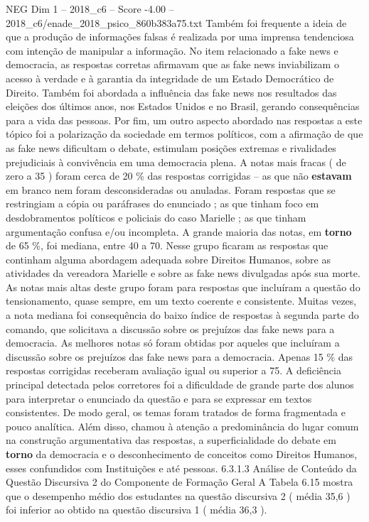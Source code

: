 \begin{textsample}{NEG Dim 1 – 2018\_c6 – Score -4.00 – 2018\_c6/enade\_2018\_psico\_860b383a75.txt}
Também foi frequente a ideia de que a produção de informações falsas é realizada por uma imprensa tendenciosa com intenção de manipular a informação.
No item relacionado a fake news e democracia, as respostas corretas afirmavam que as fake news inviabilizam o acesso à verdade e à garantia da integridade de um Estado Democrático de Direito.
Também foi abordada a influência das fake news nos resultados das eleições dos últimos anos, nos Estados Unidos e no Brasil, gerando consequências para a vida das pessoas.
Por fim, um outro aspecto abordado nas respostas a este tópico foi a polarização da sociedade em termos políticos, com a afirmação de que as fake news dificultam o debate, estimulam posições extremas e rivalidades prejudiciais à convivência em uma democracia plena.
A notas mais fracas ( de zero a 35 ) foram cerca de 20 \% das respostas corrigidas – as que não \textbf{estavam} em branco nem foram desconsideradas ou anuladas.
Foram respostas que se restringiam a cópia ou paráfrases do enunciado ; as que tinham foco em desdobramentos políticos e policiais do caso Marielle ; as que tinham argumentação confusa e/ou incompleta.
A grande maioria das notas, em \textbf{torno} de 65 \%, foi mediana, entre 40 a 70.
Nesse grupo ficaram as respostas que continham alguma abordagem adequada sobre Direitos Humanos, sobre as atividades da vereadora Marielle e sobre as fake news divulgadas após sua morte.
As notas mais altas deste grupo foram para respostas que incluíram a questão do tensionamento, quase sempre, em um texto coerente e consistente.
Muitas vezes, a nota mediana foi consequência do baixo índice de respostas à segunda parte do comando, que solicitava a discussão sobre os prejuízos das fake news para a democracia.
As melhores notas só foram obtidas por aqueles que incluíram a discussão sobre os prejuízos das fake news para a democracia.
Apenas 15 \% das respostas corrigidas receberam avaliação igual ou superior a 75.
A deficiência principal detectada pelos corretores foi a dificuldade de grande parte dos alunos para interpretar o enunciado da questão e para se expressar em textos consistentes.
De modo geral, os temas foram tratados de forma fragmentada e pouco analítica.
Além disso, chamou à atenção a predominância do lugar comum na construção argumentativa das respostas, a superficialidade do debate em \textbf{torno} da democracia e o desconhecimento de conceitos como Direitos Humanos, esses confundidos com Instituições e até pessoas. 6.3.1.3 Análise de Conteúdo da Questão Discursiva 2 do Componente de Formação Geral A Tabela 6.15 mostra que o desempenho médio dos estudantes na questão discursiva 2 ( média 35,6 ) foi inferior ao obtido na questão discursiva 1 ( média 36,3 ).

\end{textsample}
